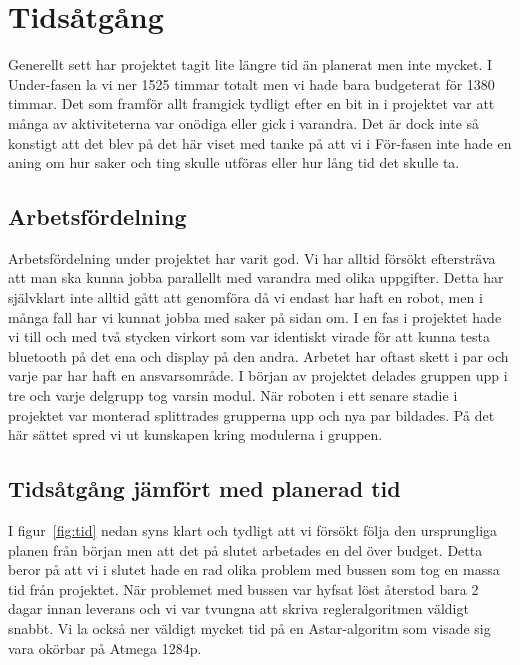 \documentclass[a4paper,12pt,fleqn]{article}
\begin{document}
\addto\captionsswedish{\renewcommand{\contentsname}{Innehållsförteckning}}

\tableofcontents
\newpage
\pagestyle{fancy}


\section{Tidsåtgång}
Generellt sett har projektet tagit lite längre tid än planerat men inte mycket. I Under-fasen la vi ner 1525 timmar totalt men vi hade bara budgeterat för 1380 timmar. Det som framför allt framgick tydligt efter en bit in i projektet var att många av aktiviteterna var onödiga eller gick i varandra. Det är dock inte så konstigt att det blev på det här viset med tanke på att vi i För-fasen inte hade en aning om hur saker och ting skulle utföras eller hur lång tid det skulle ta. 
\subsection{Arbetsfördelning}
Arbetsfördelning under projektet har varit god. Vi har alltid försökt eftersträva att man ska kunna jobba parallellt med varandra med olika uppgifter. Detta har självklart inte alltid gått att genomföra då vi endast har haft en robot, men i många fall har vi kunnat jobba med saker på sidan om. I en fas i projektet hade vi till och med två stycken virkort som var identiskt virade för att kunna testa bluetooth på det ena och display på den andra. Arbetet har oftast skett i par och varje par har haft en ansvarsområde. I början av projektet delades gruppen upp i tre och varje delgrupp tog varsin modul. När roboten i ett senare stadie i projektet var monterad splittrades grupperna upp och nya par bildades. På det här sättet spred vi ut kunskapen kring modulerna i gruppen. 

\subsection{Tidsåtgång jämfört med planerad tid}
I figur~\ref{fig:tid} nedan syns klart och tydligt att vi försökt följa den ursprungliga planen från början men att det på slutet arbetades en del över budget. Detta beror på att vi i slutet hade en rad olika problem med bussen som tog en massa tid från projektet. När problemet med bussen var hyfsat löst återstod bara 2 dagar innan leverans och vi var tvungna att skriva regleralgoritmen väldigt snabbt. Vi la också ner väldigt mycket tid på en Astar-algoritm som visade sig vara okörbar på Atmega 1284p. 
\end{document}
